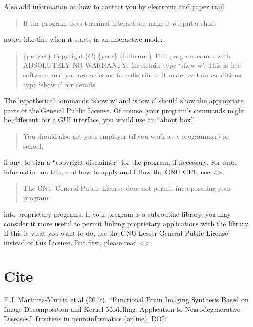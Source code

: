\documentclass[letterpaper,10pt,english]{sphinxmanual}
\begin{document}
Also add information on how to contact you by electronic and paper mail.
\begin{quote}

If the program does terminal interaction, make it output a short
\end{quote}

notice like this when it starts in an interactive mode:
\begin{quote}

\{project\}  Copyright (C) \{year\}  \{fullname\}
This program comes with ABSOLUTELY NO WARRANTY; for details type {\color{red}\bfseries{}{}`}show w’.
This is free software, and you are welcome to redistribute it
under certain conditions; type {\color{red}\bfseries{}{}`}show c’ for details.
\end{quote}

The hypothetical commands {\color{red}\bfseries{}{}`}show w’ and {\color{red}\bfseries{}{}`}show c’ should show the appropriate
parts of the General Public License.  Of course, your program’s commands
might be different; for a GUI interface, you would use an “about box”.
\begin{quote}

You should also get your employer (if you work as a programmer) or school,
\end{quote}

if any, to sign a “copyright disclaimer” for the program, if necessary.
For more information on this, and how to apply and follow the GNU GPL, see
\textless{}\textgreater{}.
\begin{quote}

The GNU General Public License does not permit incorporating your program
\end{quote}

into proprietary programs.  If your program is a subroutine library, you
may consider it more useful to permit linking proprietary applications with
the library.  If this is what you want to do, use the GNU Lesser General
Public License instead of this License.  But first, please read
\textless{}\textgreater{}.


\chapter{Cite}
\label{\detokenize{index:cite}}
F.J. Martinez-Murcia et al (2017). “Functional Brain Imaging Synthesis Based on Image Decomposition and Kernel Modelling: Application to Neurodegenerative Diseases.” Frontiers in neuroinformatics (online). DOI: 
\end{document}
